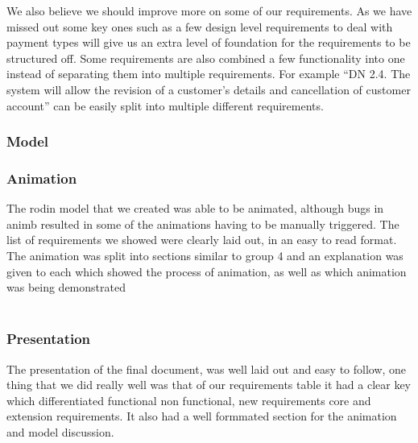 \documentclass[a4paper]{article}
\begin{document}
We also believe we should improve more on some of our requirements. As we have missed out some key ones such as a few design level requirements to deal with payment types will give us an extra level of foundation for the requirements to be structured off. Some requirements are also combined a few functionality into one instead of separating them into multiple requirements. For example “DN 2.4. The system will allow the revision of a customer's details and cancellation of customer account” can be easily split into multiple different requirements.
\pagebreak
\subsubsection{Model}

\subsubsection{Animation}
The rodin model that we created was able to be animated, although bugs in animb resulted in some of the animations having to be manually triggered. The list of requirements we showed were clearly laid out, in an easy to read format. The animation was split into sections similar to group 4 and an explanation was given to each which showed the process of animation, as well as which animation was being demonstrated
\\\\
\subsubsection{Presentation}
The presentation of the final document, was well laid out and easy to follow, one thing that we did really well was that of our requirements table it had a clear key  which differentiated functional non functional, new requirements core and extension requirements. It also had a well formmated section for the animation and model discussion. 
\\\\




\pagebreak
\end{document}
